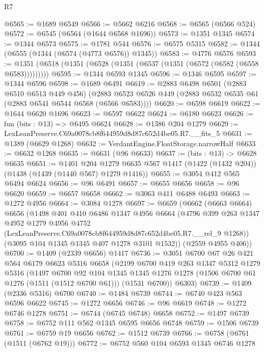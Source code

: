\begin{lexlean}{R7}
\begin{coremodule}
@6565 := @1689 @6549
@6566 := @5662 @6216
@6568 := @6565 (@6566 @524)
@6572 := @6545 (@6564 (@1644 @6568 @1696))
@6573 := @1351 @1345
@6574 := @1344 @6573
@6575 := @1781 @544
@6576 := @6575 @5315
@6582 := @1344 (@6555 (@1344 (@6574 (@4773 @6576)) @1345))
@6583 := @4776 @6576
@6593 := @1351 (@6518 (@1351 (@6528 (@1351 (@6537 (@1351 (@6572 (@6582 (@6558 @6583)))))))))
@6595 := @1344 @6593 @1345
@6596 := @1346 @6595
@6597 := @1344 @6596
@6598 := @1689 @6491
@6619 := @2883
    @6498
    @6501
    (@2883 @6510 @6513 @449 @456)
    (@2883 @6523 @6526 @449 (@2883 @6532 @6535 @61 (@2883 @6541 @6544 @6568 (@6566 @6583))))
@6620 := @6598 @6619
@6622 := @1644 @6620 @1696
@6623 := @6597 @6622
@6624 := @6180 @6623
@6626 := fun (bits : @13) => @6495 @6624
@6628 := @1386 @204 @1279
@6629 := LexLeanPreserve.C69a0078cb8f644959d8d87c652d4be05.R7.__fits_5
@6631 := @1389 (@6629 @1268)
@6632 := VerdantEngine.FloatStorage.narrowHalf
@6633 := @6632 @1268
@6635 := @6631 (@96 @6633)
@6637 := (bits : @13) -> @6628 @6635
@6651 := @1401
    @204
    @1279
    @6635
    @567
    @1417
    (@1422 (@1432 @204))
    (@1438 (@1439 (@1440 @567) @1279 @1416))
@6655 := @3054 @412 @565 @6494 @6624
@6656 := @96 @6491
@6657 := @6655 @6656
@6658 := @96 @6620
@6659 := @6657 @6658
@6662 := @3063 @411 @6488 @6493
@6663 := @1272 @4956
@6664 := @3084 @1278
@6697 := @6659
    (@6662
      (@6663 @6664)
      @6656
      (@1498
        @401
        @410
        @6486
        @1347
        @4956
        @6664
        (@4796
          @399
          @263
          @1347
          @4952
          @1279
          @4956
          @4752
          (LexLeanPreserve.C69a0078cb8f644959d8d87c652d4be05.R7.__rel_9 @1268))
        (@3095 @104 @1345 @1345 @407 @1278 @3101 @1532))
      (@2559 @4955 @406))
@6700 := @1409 (@2339 @6656) @1417
@6736 := @3051
    @6700
    @67
    @26
    @421
    @564
    @6179
    @6623
    @5316
    @6658
    (@2199
      @6700
      @419
      @263
      @1347
      @5312
      @1279
      @5316
      (@1497
        @6700
        @92
        @104
        @1345
        @1345
        @1276
        @1278
        (@1506 @6700 @61 @1276 (@1511 (@1512 @6700 @61)))
        (@1531 @6700))
      @6303)
@6739 := @1409 (@2336 @5316) @6700
@6740 := @1484 @6739
@6744 := @6740 @423 @563 @6596 @6622
@6745 := @1272 @6656
@6746 := @96 @6619
@6748 := @1272 @6746 @1278
@6751 := @6744 (@6745 @6748) @6658
@6752 := @1497 @6739
@6758 := @6752 @111 @562 @1345 @6595 @6656 @6748
@6759 := @1506 @6739
@6761 := @6759 @19 @6656
@6762 := @1512 @6739
@6766 := @6758 (@6761 (@1511 (@6762 @19)))
@6772 := @6752 @560 @104 @6593 @1345 @6746 @1278

\end{coremodule}
\end{lexlean}

